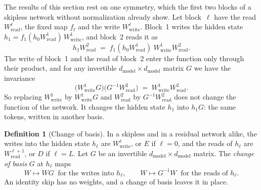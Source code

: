 \documentclass[10pt]{article}
\theoremstyle{definition}
\newtheorem{definition}[theorem]{Definition}
\theoremstyle{remark}
\newcommand{\Wread}{W_{\mathrm{read}}}
\newcommand{\Wwrite}{W_{\mathrm{write}}}
\newcommand{\dm}{d_{\mathrm{model}}}
\begin{document}
The results of this section rest on one symmetry, which the first two blocks of a skipless network without normalization already show. Let block~$\ell$ have the read $\Wread^{\ell}$, the fixed map $f_\ell$ and the write $\Wwrite^{\ell}$. Block~1 writes the hidden state $h_1 = f_1(h_0\Wread^{1})\,\Wwrite^{1}$, and block~2 reads it as
\begin{equation}\label{eq:product}
h_1\Wread^{2} \;=\; f_1(h_0\Wread^{1})\;\Wwrite^{1}\Wread^{2}.
\end{equation}
The write of block~1 and the read of block~2 enter the function only through their product, and for any invertible $\dm\times\dm$ matrix $G$ we have the invariance
\begin{equation}\label{eq:invariance}
\big(\Wwrite^{1}G\big)\big(G^{-1}\Wread^{2}\big) \;=\; \Wwrite^{1}\Wread^{2}.
\end{equation}
So replacing $\Wwrite^{1}$ by $\Wwrite^{1}G$ and $\Wread^{2}$ by $G^{-1}\Wread^{2}$ does not change the function of the network. It changes the hidden state $h_1$ into $h_1G$: the same tokens, written in another basis.

\begin{definition}[Change of basis]\label{def:cob}
In a skipless and in a residual network alike, the writes into the hidden state $h_\ell$ are $\Wwrite^{\ell}$, or $E$ if $\ell = 0$, and the reads of $h_\ell$ are $\Wread^{\ell+1}$, or $D$ if $\ell = L$. Let $G$ be an invertible $\dm\times\dm$ matrix. The \emph{change of basis} $G$ at $h_\ell$ maps
\begin{equation}\label{eq:cob}
W \mapsto WG \ \text{ for the writes into } h_\ell, \qquad W \mapsto G^{-1}W \ \text{ for the reads of } h_\ell.
\end{equation}
An identity skip has no weights, and a change of basis leaves it in place.
\end{definition}
\end{document}
